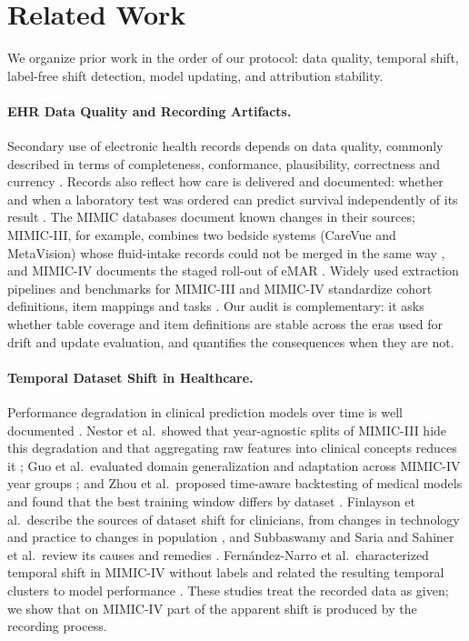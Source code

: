 \documentclass[10pt,a4paper,twocolumn]{article}
\begin{document}
	\section{Related Work}
	We organize prior work in the order of our protocol: data quality, temporal shift, label-free shift detection, model updating, and attribution stability.
	
	\paragraph{EHR Data Quality and Recording Artifacts.}
	Secondary use of electronic health records depends on data quality, commonly described in terms of completeness, conformance, plausibility, correctness and currency \citep{weiskopf2013methods,kahn2016harmonized}. Records also reflect how care is delivered and documented: whether and when a laboratory test was ordered can predict survival independently of its result \citep{agniel2018biases}. The MIMIC databases document known changes in their sources; MIMIC-III, for example, combines two bedside systems (CareVue and MetaVision) whose fluid-intake records could not be merged in the same way \citep{johnson2016mimiciii}, and MIMIC-IV documents the staged roll-out of eMAR \citep{johnson2023mimic}. Widely used extraction pipelines and benchmarks for MIMIC-III and MIMIC-IV standardize cohort definitions, item mappings and tasks \citep{harutyunyan2019multitask,wang2020mimicextract,gupta2022extensive}. Our audit is complementary: it asks whether table coverage and item definitions are stable across the eras used for drift and update evaluation, and quantifies the consequences when they are not.
	
	\paragraph{Temporal Dataset Shift in Healthcare.}
	Performance degradation in clinical prediction models over time is well documented \citep{davis2017calibration,nestor2019feature,guo2022evaluation}. Nestor et al.\ showed that year-agnostic splits of MIMIC-III hide this degradation and that aggregating raw features into clinical concepts reduces it \citep{nestor2019feature}; Guo et al.\ evaluated domain generalization and adaptation across MIMIC-IV year groups \citep{guo2022evaluation}; and Zhou et al.\ proposed time-aware backtesting of medical models and found that the best training window differs by dataset \citep{zhou2023evaluating}. Finlayson et al.\ describe the sources of dataset shift for clinicians, from changes in technology and practice to changes in population \citep{finlayson2021clinician}, and Subbaswamy and Saria and Sahiner et al.\ review its causes and remedies \citep{subbaswamy2020development,sahiner2023data}. Fern\'andez-Narro et al.\ characterized temporal shift in MIMIC-IV without labels and related the resulting temporal clusters to model performance \citep{fernandeznarro2025unsupervised}. These studies treat the recorded data as given; we show that on MIMIC-IV part of the apparent shift is produced by the recording process.
	
\end{document}
